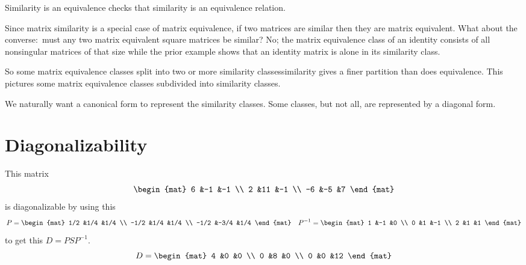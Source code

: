 \documentclass[10pt,t]{beamer}
\begin{document}
\begin{frame}{Similarity is an equivalence}
 checks that
similarity is an equivalence relation.

\pause
Since matrix similarity is a special case of matrix equivalence, 
if two matrices are similar then they are matrix equivalent.
What about the converse:~must any two matrix equivalent square matrices be 
similar?
No; the matrix equivalence class
of an identity consists of all nonsingular matrices of that size while the 
prior example shows that an identity matrix is alone in its similarity
class. 

\pause
So some matrix equivalence classes
split into two or more similarity classes\Dash similarity gives a finer
partition than does equivalence.
This pictures some matrix equivalence classes subdivided into
similarity classes.

\pause
We naturally want a canonical form to represent the similarity classes.
Some classes, but not all,
are represented by a diagonal form.
\end{frame}




\section{Diagonalizability}
\begin{frame}
\df[df:Diagonalizable]

\ex
This matrix
\begin{equation*}
  \begin{mat}
    6 &-1  &-1 \\
    2 &11  &-1 \\
   -6 &-5  &7
  \end{mat}
\end{equation*}
is diagonalizable by using this
\begin{equation*}
  P=
  \begin{mat}
    1/2 &1/4  &1/4 \\
   -1/2 &1/4  &1/4 \\
   -1/2 &-3/4 &1/4
  \end{mat}
  \quad
  P^{-1}=
  \begin{mat}
    1 &-1 &0 \\
    0 &1 &-1 \\
    2 &1 &1
  \end{mat}
\end{equation*}
to get this $D=PSP^{-1}$.
\begin{equation*}
  D=
  \begin{mat}
    4 &0 &0 \\
    0 &8 &0 \\
    0 &0 &12
  \end{mat}
\end{equation*}
\end{frame}
\begin{frame}
\ex  
{}  
\end{frame}
\end{document}

